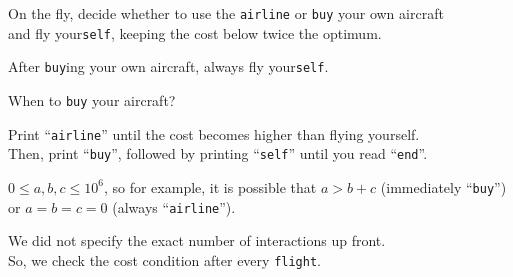 \begin{frame}
    \frametitle{\problemtitle}
    \begin{description}
        \item<+->[Problem:] On the fly, decide whether to use the \texttt{airline}
            or \texttt{buy} your own aircraft \\ and fly your\texttt{self}, keeping the cost below twice the optimum.
        \item<+->[Observation:] After \texttt{buy}ing your own aircraft, always fly your\texttt{self}.
        \item<+->[To solve:] When to \texttt{buy} your aircraft?
             \\
        \item<+->[Solution:] Print ``\texttt{airline}'' until the cost becomes higher than flying yourself. \\
            Then, print ``\texttt{buy}'', followed by printing ``\texttt{self}'' until you read ``\texttt{end}''.
        \item<+->[Edge cases:] $0 \leq a,b,c \leq 10^6$, so for example, it is possible that $a > b + c$ (immediately ``\texttt{buy}'') \\
            or $a = b = c = 0$ (always ``\texttt{airline}'').
        \item<+->[Note:] We did not specify the exact number of interactions up front. \\
            So, we check the cost condition after every \texttt{flight}.
    \end{description}
    \solvestats
\end{frame}
